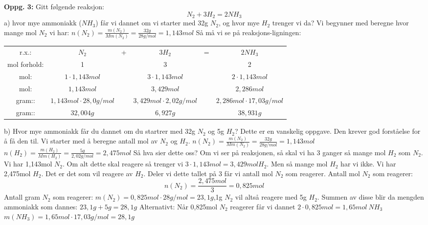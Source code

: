 \documentclass[12pt,a4paper]{article}
\begin{document}
\noindent\textbf{Oppg. 3:}\nl
Gitt følgende reaksjon:
$$N_2+3H_2=2NH_3$$
a) hvor mye ammoniakk ($NH_3$) får vi dannet om vi starter med 32g $N_2$, og hvor mye $H_2$ trenger vi da?\nl
Vi begynner med  beregne hvor mange mol $N_2$ vi har:\nl
$n(N_2)=\frac{m(N_2)}{Mm(N_2)}=\frac{32g}{28g/mol}=1,143mol$
\newpage
Så må vi se på reaksjons-ligningen:
\begin{table}[H]
    \centering
    \begin{tabular}{cccccc}
         r.x.:& $N_2$&+ &$3H_2$&= & $2NH_3$\\
              mol forhold:&1 & &3 & &2 \\
              mol:&$1\cdot 1,143mol$ & &$3\cdot 1,143mol$ & &$2\cdot 1,143mol$ \\
              mol:&$1,143mol$ & &$3,429mol$ & &$2,286mol$ \\
              gram::&$1,143mol\cdot 28,0g/mol$ & &$3,429mol\cdot 2,02g/mol$ & &$2,286mol\cdot 17,03g/mol$ \\
              gram::&$32,004g$ & &$6,927g$ & &$38,931g$ \\
    \end{tabular}
\end{table}\nl
b) Hvor mye ammoniakk får du dannet om du startrer med 32g $N_2$ og 5g $H_2$?\nl
Dette er en vanskelig oppgave. Den krever god forståelse for å få den til.  Vi starter med å beregne antall mol av $N_2$ og $H_2$.\nl
$n(N_2)=\frac{m(N_2)}{Mm(N_2)}=\frac{32g}{28g/mol}=1,143mol$\nl
$n(H_2)=\frac{m(H_2)}{Mm(H_2)}=\frac{5g}{2,02g/mol}=2,475mol$\nl
Så hva sier dette oss? Om vi ser på reaksjonen, så skal vi ha 3 ganger så mange mol $H_2$ som $N_2$.  Vi har 1,143mol $N_2$. Om  alt dette skal reagere så trenger vi $3\cdot 1,143mol=3,429mol H_2$.  Men så mange mol $H_2$ har vi ikke. Vi har 2,475mol $H_2$.  Det er det som vil reagere av $H_2$.  Deler vi dette tallet på 3 får vi antall mol $N_2$ som reagerer.\nl
Antall mol $N_2$ som reagerer:\nl
$$n(N_2)=\frac{2,475mol}{3}=0,825mol$$\nl
Antall gram $N_2$ som reagerer:\nl
$m(N_2)=0,825mol\cdot 28g/mol=23,1g$,1g $N_2$ vil altså reagere med 5g $H_2$.  Summen av disse blir da mengden ammoniakk som dannes:  $23,1g+5g=28,1g$\newpage
Alternativt:\nl
Når 0,825mol $N_2$ reagerer får vi dannet $2\cdot 0,825mol=1,65mol \ NH_3$\nl
$m(NH_3)=1,65mol\cdot 17,03g/mol=28,1g$
\end{document}
